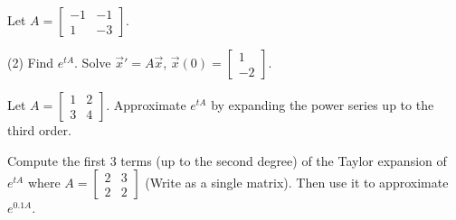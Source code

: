 \documentclass{ximera}
\begin{document}
\begin{exercise}
    Let $A = 
    \left[ 
        \begin{smallmatrix}
            -1 & -1 \\
            1 & -3
        \end{smallmatrix} 
    \right]$.
    \begin{tasks}(2)
    \task Find $e^{tA}$.
    \task Solve ${\vec{x}}' = A \vec{x}$, $\vec{x}(0) =
    \left[ 
        \begin{smallmatrix}
            1 \\
            -2
        \end{smallmatrix} 
    \right]$.
    \end{tasks}
\end{exercise}

\begin{exercise}
    Let $A = \left[ \begin{smallmatrix}
        1 & 2 \\
        3 & 4 
    \end{smallmatrix} \right]$.
    Approximate $e^{tA}$ by expanding the power series up to the third order.
\end{exercise}

\begin{exercise}%
    Compute the first 3 terms (up to the second degree) of the Taylor expansion of $e^{tA}$ where
    $A=\left[ \begin{smallmatrix}
        2 & 3 \\
        2 & 2 
    \end{smallmatrix}\right]$ 
    (Write as a single matrix). Then use it to approximate $e^{0.1A}$.
\end{exercise}
\end{document}
